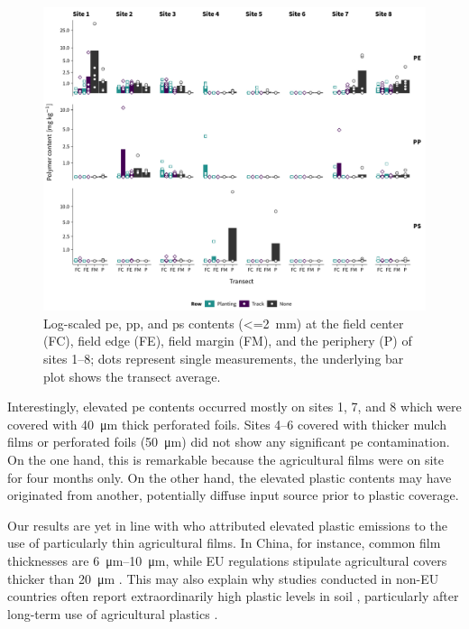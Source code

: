 \begin{figure}[t]
	\centering
	\includegraphics[width=\textwidth]{figures/py-screening}
	\caption[\Ac{pe}, \ac{pp}, and \ac{ps} contents (\SI{<=2}{\milli\meter}).]{Log-scaled \ac{pe}, \ac{pp}, and \ac{ps} contents (\SI{<=2}{\milli\meter}) at the field center (FC), field edge (FE), field margin (FM), and the periphery (P) of sites 1--8; dots represent single measurements, the underlying bar plot shows the transect average.}
	\label{fig:py-screening}
	\forceversofloat
\end{figure}

Interestingly, elevated \ac{pe} contents occurred mostly on sites 1, 7, and 8 which were covered with \SI{40}{\micro\meter} thick perforated foils. Sites 4--6 covered with thicker mulch films or perforated foils (\SI{50}{\micro\meter}) did not show any significant \ac{pe} contamination.
On the one hand, this is remarkable because the agricultural films were on site for four months only. On the other hand, the elevated plastic contents may have originated from another, potentially diffuse input source prior to plastic coverage.

Our results are yet in line with \citet{ZhangStatus2016} who attributed elevated plastic emissions to the use of particularly thin agricultural films. In China, for instance, common film thicknesses are \SIrange{6}{10}{\micro\meter}, while EU regulations stipulate agricultural covers thicker than \SI{20}{\micro\meter} \citep{EN13655Plastics2018}. This may also explain why studies conducted in non-EU countries often report extraordinarily high plastic levels in soil \citep{LiuWhite2014}, particularly after long-term use of agricultural plastics \citep{HuangAgricultural2020,ZhangDistribution2018}.


